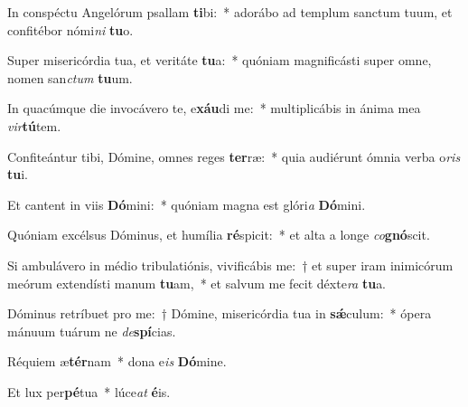 ﻿\item In conspéctu Angelórum psallam \textbf{ti}bi:~* adorábo ad templum sanctum tuum, et confitébor nómi\textit{ni} \textbf{tu}o.
\item Super misericórdia tua, et veritáte \textbf{tu}a:~* quóniam magnificásti super omne, nomen san\textit{ctum} \textbf{tu}um.
\item In quacúmque die invocávero te, e\textbf{xáu}di me:~* multiplicábis in ánima mea \textit{vir}\textbf{tú}tem.
\item Confiteántur tibi, Dómine, omnes reges \textbf{ter}ræ:~* quia audiérunt ómnia verba o\textit{ris} \textbf{tu}i.
\item Et cantent in viis \textbf{Dó}mini:~* quóniam magna est glóri\textit{a} \textbf{Dó}mini.
\item Quóniam excélsus Dóminus, et humília \textbf{ré}spicit:~* et alta a longe \textit{co}\textbf{gnó}scit.
\item Si ambulávero in médio tribulatiónis, vivificábis me:~† et super iram inimicórum meórum extendísti manum \textbf{tu}am,~* et salvum me fecit déxte\textit{ra} \textbf{tu}a.
\item Dóminus retríbuet pro me:~† Dómine, misericórdia tua in \textbf{sǽ}culum:~* ópera mánuum tuárum ne \textit{de}\textbf{spí}cias.
\item Réquiem æ\textbf{tér}nam~* dona e\textit{is} \textbf{Dó}mine.
\item Et lux per\textbf{pé}tua~* lúce\textit{at} \textbf{é}is.